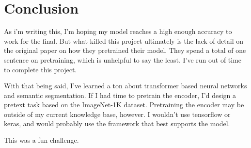 \documentclass[12pt]{article}
\begin{document}
    \section{Conclusion}

    As i'm writing this, I'm hoping my model reaches a high enough accuracy to work for the final. But what killed this project ultimately is the lack of detail on the original paper on how they pretrained their model. They spend a total of one sentence on pretraining, which is unhelpful to say the least. I've run out of time to complete this project.

    With that being said, I've learned a ton about transformer based neural networks and semantic segmentation. If I had time to pretrain the encoder, I'd design a pretext task based on the ImageNet-1K dataset. Pretraining the encoder may be outside of my current knowledge base, however. I wouldn't use tensorflow or keras, and would probably use the framework that best supports the model.

    This was a fun challenge.

    \newpage
    
\end{document}
